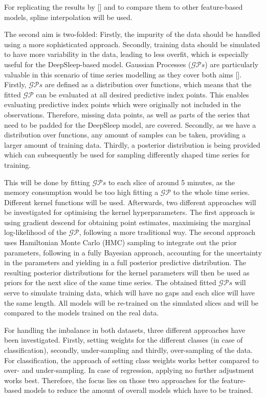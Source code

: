 \documentclass[11pt]{scrartcl}
\begin{document}
For replicating the results by [\cite{patternshrd}] and to compare them to other feature-based models, spline interpolation will be used.

The second aim is two-folded: Firstly, the impurity of the data should be handled using a more sophisticated approach. Secondly, training data should be simulated to have more variability in the data, leading to less overfit, which is especially useful for the DeepSleep-based model. Gaussian Processes ($\mathcal{GP}s$) are particularly valuable in this scenario of time series modelling as they cover both aims [\cite{Roberts_gaussianprocesses}]. Firstly, $\mathcal{GP}s$ are defined as a distribution over functions, which means that the fitted $\mathcal{GP}$ can be evaluated at all desired predictive index points. This enables evaluating predictive index points which were originally not included in the observations. Therefore, missing data points, as well as parts of the series that need to be padded for the DeepSleep model, are covered. Secondly, as we have a distribution over functions, any amount of samples can be taken, providing a larger amount of training data. Thirdly, a posterior distribution is being provided which can subsequently be used for sampling differently shaped time series for training.

This will be done by fitting $\mathcal{GP}s$ to each slice of around 5 minutes, as the memory consumption would be too high fitting a $\mathcal{GP}$ to the whole time series. Different kernel functions will be used. Afterwards, two different approaches will be investigated for optimising the kernel hyperparameters. The first approach is using gradient descend for obtaining point estimates, maximising the marginal log-likelihood of the $\mathcal{GP}$, following a more traditional way. The second approach uses Hamiltonian Monte Carlo (HMC) sampling to integrate out the prior parameters, following in a fully Bayesian approach, accounting for the uncertainty in the parameters and yielding in a full posterior predictive distribution. The resulting posterior distributions for the kernel parameters will then be used as priors for the next slice of the same time series. The obtained fitted $\mathcal{GP}s$ will serve to simulate training data, which will have no gaps and each slice will have the same length. All models will be re-trained on the simulated slices and will be compared to the models trained on the real data.

For handling the imbalance in both datasets, three different approaches have been investigated. Firstly, setting weights for the different classes (in case of classification), secondly, under-sampling and thirdly, over-sampling of the data. For classification, the approach of setting class weights works better compared to over- and under-sampling. In case of regression, applying no further adjustment works best. Therefore, the focus lies on those two approaches for the feature-based models to reduce the amount of overall models which have to be trained.
\end{document}
